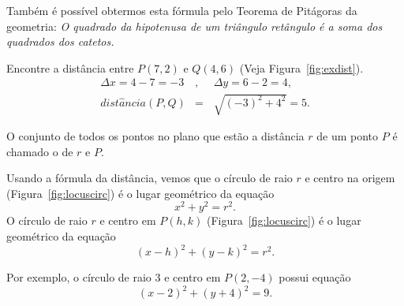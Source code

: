 \documentclass{svmono}
\begin{document}
Também é possível obtermos esta fórmula pelo Teorema de Pitágoras
da geometria: \emph{O quadrado da hipotenusa de um triângulo
retângulo é a soma dos quadrados dos catetos.}

\begin{example}
\label{ex:distance}
Encontre a distância entre $P(7,2)$ e $Q(4,6)$
(Veja Figura~\ref{fig:exdist}).
\begin{eqnarray*}
\Delta x = 4 - 7 = -3 &,\phantom{,} & \Delta y = 6 - 2 = 4, \\
 dist\hat{a}ncia(P,Q) & =           & \sqrt{(-3)^2 + 4^2} = 5.
\end{eqnarray*}
\end{example}


\begin{defin}[círculo]
O conjunto de todos os pontos no plano que estão a distância $r$ de um ponto
$P$ é chamado o  de  $r$ e  $P$.
\end{defin}

Usando a fórmula da distância, vemos que o círculo de raio $r$ e centro na
origem (Figura~\ref{fig:locuscirc}) é o lugar geométrico da equação
\[
	x^2 + y^2 = r^2.
\]
O círculo de raio $r$ e centro em $P(h,k)$ (Figura~\ref{fig:locuscirc}) é
o lugar geométrico da equação
\[
	(x-h)^2 + (y-k)^2 = r^2.
\]


Por exemplo, o círculo de raio $3$ e centro em $P(2,-4)$ possui equação
\[
	(x-2)^2 + (y+4)^2 = 9.
\]
\end{document}
